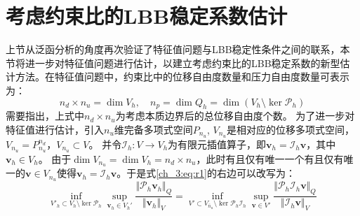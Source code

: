 \section{考虑约束比的LBB稳定系数估计}

上节从泛函分析的角度再次验证了特征值问题与LBB稳定性条件之间的联系，本节将进一步对特征值问题进行估计，以建立考虑约束比的LBB稳定系数的新型估计方法。在特征值问题中，约束比中的位移自由度数量和压力自由度数量可表示为：
\begin{equation}
    n_d\times n_u = \dim V_h, \quad n_p = \dim Q_h = \dim (V_h \setminus \ker \mathcal P_h)
\end{equation}
需要指出，上式中$n_d\times n_u$为考虑本质边界后的总位移自由度个数。
为了进一步对特征值进行估计，引入$n_u$维完备多项式空间$P_{n_u}$,
$V_{n_u}$是相对应的位移多项式空间，$V_{n_u} = P_{n_u}^{n_d}$，$V_{n_u}\subset V$。
并令$\mathcal I_h: V \rightarrow V_h$为有限元插值算子，即$\boldsymbol v_h = \mathcal I_h \boldsymbol v$，其中$\boldsymbol v_h \in V_h$。
由于$\dim V_{n_u} = \dim V_h = n_d\times n_u$，此时有且仅有唯一一个有且仅有唯一的$\boldsymbol v \in V_{n_u}$使得$\boldsymbol v_h = \mathcal I_h \boldsymbol v$。于是式\eqref{ch_3:eq:r1}的右边可以改写为：
\begin{equation}\label{ch_3:eq:r21}
    \inf_{V'_h \subset V_h\setminus \ker \mathcal P_h}\sup_{\boldsymbol v_h \in V_h'} \frac{\Vert \mathcal P_h \boldsymbol v_h \Vert_Q}{\Vert \boldsymbol v_h \Vert_V} = 
    \inf_{V'\subset V_{\bar{n}_u}\setminus \ker \mathcal P_h \mathcal I_h}\sup_{\boldsymbol v \in V'} \frac{\Vert \mathcal P_h \mathcal I_h \boldsymbol v \Vert_Q}{\Vert \mathcal I_h \boldsymbol v \Vert_V}
\end{equation}

